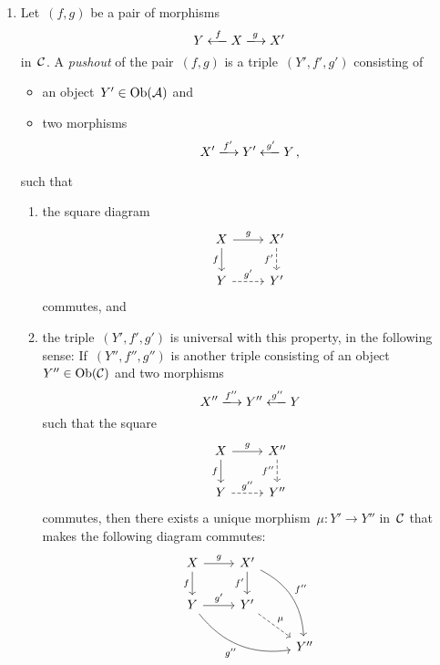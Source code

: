 \begin{definition*}
\begin{enumerate}
    \item
      Let~$(f,g)$ be a pair of morphisms
      \[
        Y \xlongfrom{f} X \xlongto{g} X'
      \]
      in~$\mathcal{C}$.
      A \emph{pushout} of the pair~$(f,g)$ is a triple~$(Y',f',g')$ consisting of
      \begin{itemize}
        \item
          an object~$Y' \in \operatorname{Ob}(\mathcal{A})$ and
        \item
          two morphisms
          \[
            X' \xlongto{f'} Y' \xlongfrom{g'} Y \,,
          \]
      \end{itemize}
      such that
      \begin{enumerate}[label=(PO\arabic*)]
        \item
          the square diagram
          \[
            \begin{tikzcd}
                X
                \arrow{r}[above]{g}
                \arrow{d}[left]{f}
              & X'
                \arrow[dashed]{d}[left]{f'}
              \\
                Y
                \arrow[dashed]{r}[above]{g'}
              & Y'
            \end{tikzcd}
          \]
          commutes, and
        \item
          the triple~$(Y',f',g')$ is universal with this property, in the following sense:
          If~$(Y'', f'', g'')$ is another triple consisting of an object~$Y'' \in \operatorname{Ob}(\mathcal{C})$ and two morphisms
          \[
            X'' \xlongto{f''} Y'' \xlongfrom{g''} Y
          \]
          such that the square
          \[
            \begin{tikzcd}
                X
                \arrow{r}[above]{g}
                \arrow{d}[left]{f}
              & X''
                \arrow[dashed]{d}[left]{f''}
              \\
                Y
                \arrow[dashed]{r}[above]{g''}
              & Y''
            \end{tikzcd}
          \]
          commutes, then there exists a unique morphism~$\mu \colon Y' \to Y''$ in~$\mathcal{C}$ that makes the following diagram commutes:
          \[
            \begin{tikzcd}
                X
                \arrow{r}[above]{g}
                \arrow{d}[left]{f}
              & X'
                \arrow[bend left]{ddr}[above right]{f''}
                \arrow{d}[left]{f'}
              & {}
              \\
                Y
                \arrow{r}[above]{g'}
                \arrow[bend right]{drr}[below left]{g''}
              & Y'
                \arrow[dashed]{dr}[above right]{\mu}
              & {}
              \\
                {}
              & {}
              & Y''
            \end{tikzcd}
          \]
      \end{enumerate}
  \end{enumerate}
\end{definition*}


